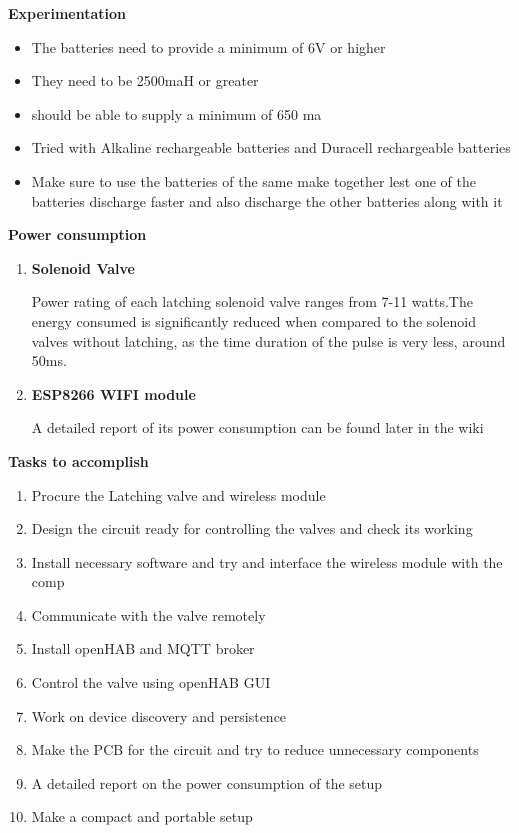 \documentclass[16pt]{article}
\begin{document}
\begin{itemize}
\hfill

{\Large{\textbf{Experimentation}}}

\begin{itemize}

\item
  The batteries need to provide a minimum of 6V or higher
\item
  They need to be 2500maH or greater
\item
  should be able to supply a minimum of 650 ma
\item
  Tried with Alkaline rechargeable batteries and Duracell rechargeable
  batteries
\item
  Make sure to use the batteries of the same make together lest one of
  the batteries discharge faster and also discharge the other batteries
  along with it
\end{itemize}

\hfill

{\Large{\item{\textbf{Power consumption}}}}

\begin{enumerate}

 
\item\textbf{Solenoid Valve}

Power rating of each latching solenoid valve
ranges from 7-11 watts.The energy consumed is significantly reduced when
compared to the solenoid valves without latching, as the time duration
of the pulse is very less, around 50ms.

\item\textbf{ESP8266 WIFI module}

A detailed report of its power consumption can be found later in the
wiki

\end{enumerate}

\end{itemize}
\hfill

{\Large{\textbf{Tasks to accomplish}}}

\begin{enumerate}

\item
  Procure the Latching valve and wireless module
\item
  Design the circuit ready for controlling the valves and check its
  working
\item
  Install necessary software and try and interface the wireless module
  with the comp
\item
  Communicate with the valve remotely
\item
  Install openHAB and MQTT broker
\item
  Control the valve using openHAB GUI
\item
  Work on device discovery and persistence
\item
  Make the PCB for the circuit and try to reduce unnecessary components
\item
  A detailed report on the power consumption of the setup
\item
  Make a compact and portable setup
\end{enumerate}
\end{document}
